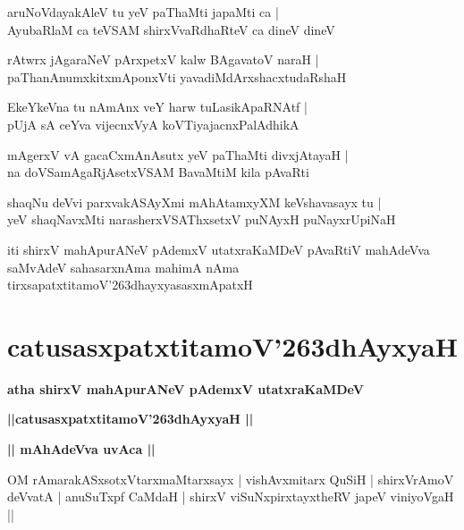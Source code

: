 \documentclass[twoside,12pt,openright]{book}
\def\S{\char'263}
\newcounter{shloka}[chapter]
\def\uvaca#1{\centerline{{\large\textbf{#1}}}}
\begin{document}
\begin{shloka}%
aruNoVdayakAleV tu yeV paThaMti japaMti ca |\\
AyubaRlaM ca teVSAM shirxVvaRdhaRteV ca dineV dineV 
\end{shloka}

\begin{shloka}%
rAtwrx jAgaraNeV pArxpetxV kalw BAgavatoV naraH |\\
paThanAnumxkitxmAponxVti yavadiMdArxshacxtudaRshaH
\end{shloka}

\begin{shloka}%
EkeYkeVna tu nAmAnx veY harw tuLasikApaRNAtf |\\
pUjA sA ceYva vijecnxVyA koVTiyajacnxPalAdhikA
\end{shloka}

\begin{shloka}%
mAgerxV vA gacaCxmAnAsutx yeV paThaMti divxjAtayaH |\\
na doVSamAgaRjAsetxVSAM BavaMtiM kila pAvaRti
\end{shloka}

\begin{shloka}%
shaqNu deVvi parxvakASAyXmi mAhAtamxyXM keVshavasayx tu |\\
yeV shaqNavxMti narasherxVSAThxsetxV puNAyxH puNayxrUpiNaH 
\end{shloka}

\begin{center}
iti shirxV mahApurANeV pAdemxV utatxraKaMDeV pAvaRtiV mahAdeVva saMvAdeV sahasarxnAma mahimA nAma 
tirxsapatxtitamoV\S dhayxyasasxmApatxH 
\end{center}

\chapter{catusasxpatxtitamoV\S dhAyxyaH}

\begin{center}
{\LARGE\bfseries atha shirxV mahApurANeV pAdemxV utatxraKaMDeV}
\end{center}

\begin{center}
{\LARGE\bfseries ||catusasxpatxtitamoV\S dhAyxyaH || }
\end{center}

\uvaca{|| mAhAdeVva uvAca ||}

\begin{shloka}%
OM rAmarakASxsotxVtarxmaMtarxsayx | vishAvxmitarx QuSiH | shirxVrAmoV \\
deVvatA | anuSuTxpf CaMdaH | shirxV viSuNxpirxtayxtheRV japeV viniyoVgaH ||
\end{shloka}
\end{document}
